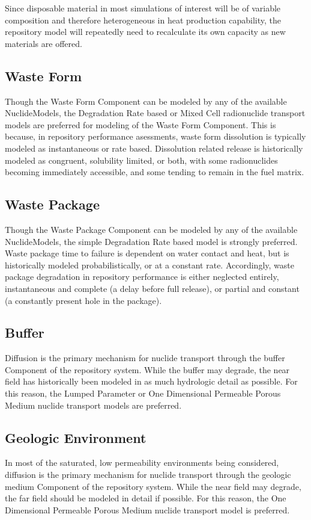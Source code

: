Since disposable material in most simulations of interest will be of variable 
composition and therefore heterogeneous in heat production capability, the 
repository model will repeatedly need to recalculate its own capacity as 
new materials are offered.

\subsection{Waste Form}
Though the Waste Form Component can be modeled by any of the available 
NuclideModels, the Degradation Rate based or Mixed Cell radionuclide transport 
models are preferred for modeling of the Waste Form Component.  This is 
because, in repository performance asessments, waste form dissolution is 
typically modeled as instantaneous or rate based. Dissolution related release 
is historically modeled as congruent, solubility limited, or both, with some 
radionuclides becoming immediately accessible, and some tending to remain in 
the fuel matrix. 

\subsection{Waste Package}
Though the Waste Package Component can be modeled by any of the available 
NuclideModels, the simple Degradation Rate based model is strongly preferred.
Waste package time to failure is dependent on water contact and heat, 
but is historically modeled probabilistically, or at a constant rate.
Accordingly, waste package degradation in repository performance is either 
neglected entirely, instantaneous and complete (a delay before full release), 
or partial and constant (a constantly present hole in the package). 


\subsection{Buffer}
Diffusion is the primary mechanism for nuclide transport through the 
buffer Component of the repository system. While the buffer may degrade, the 
near field has historically been modeled in as much hydrologic detail as 
possible. For this reason, the Lumped Parameter or One Dimensional Permeable 
Porous Medium nuclide transport models are preferred.

\subsection{Geologic Environment}
In most of the saturated, low permeability environments being considered, 
diffusion is the primary mechanism for nuclide transport through the geologic 
medium Component of the repository system. While the near field may degrade, 
the far field should be modeled in detail if possible. For this reason, the 
One Dimensional Permeable Porous Medium nuclide transport 
model is preferred.

